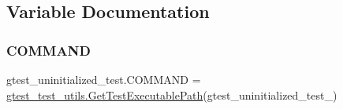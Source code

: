 \subsection{Variable Documentation}
\mbox{\label{namespacegtest__uninitialized__test_a77a36d59341a58a2e7f54f0b2e691bd7}} 
\subsubsection{\texorpdfstring{C\+O\+M\+M\+A\+ND}{COMMAND}}
{\footnotesize\ttfamily gtest\+\_\+uninitialized\+\_\+test.\+C\+O\+M\+M\+A\+ND = \hyperlink{namespacegtest__test__utils_a89ed3717984a80ffbb7a9c92f71b86a2}{gtest\+\_\+test\+\_\+utils.\+Get\+Test\+Executable\+Path}(\textquotesingle{}gtest\+\_\+uninitialized\+\_\+test\+\_\+\textquotesingle{})}

